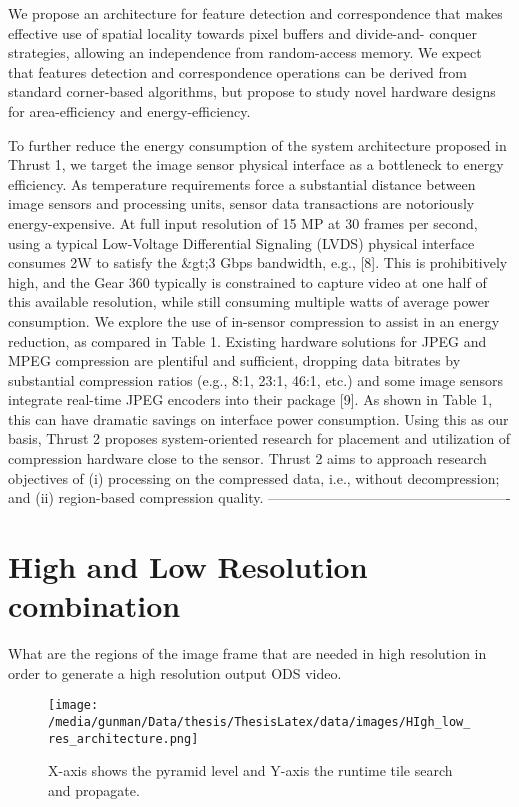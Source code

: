 We propose an architecture for feature detection and correspondence that makes effective use of spatial locality towards pixel buffers and divide-and- conquer strategies, allowing an independence from random-access memory. We expect that features detection and correspondence operations can be derived from standard corner-based algorithms, but propose to study novel hardware designs for area-efficiency and energy-efficiency. \newline

To further reduce the energy consumption of the system architecture proposed in Thrust 1, we target the image sensor physical interface as a bottleneck to energy efficiency. As temperature requirements force a substantial distance between image sensors and processing units, sensor data transactions are notoriously energy-expensive. At full input resolution of 15 MP at 30 frames per second, using a typical Low-Voltage Differential Signaling (LVDS) physical interface consumes 2W to satisfy the \&gt;3 Gbps bandwidth, e.g., [8]. This is prohibitively high, and the Gear 360 typically is constrained to capture video at one half of this available resolution, while still consuming multiple watts of average power consumption. We explore the use of in-sensor compression to assist in an energy reduction, as compared in Table 1. Existing hardware solutions for JPEG and MPEG compression are plentiful and sufficient, dropping data \newline
bitrates by substantial compression ratios (e.g., 8:1, 23:1, 46:1, etc.) and some image sensors integrate real-time JPEG encoders into their package [9]. As shown in Table 1, this can have dramatic savings on interface power consumption. Using this as our basis, Thrust 2 proposes system-oriented research for placement and utilization of compression hardware close to the sensor. Thrust 2 aims to approach research objectives of (i) processing on the compressed data, i.e., without decompression; and (ii) region-based compression quality.\newline
----------------------------------------------------


\section{High and Low Resolution combination}
What are the regions of the image frame that are needed in high resolution in order to generate a high resolution output ODS video. 
\begin{figure*}
	\begin{center}
		\texttt{[image: /media/gunman/Data/thesis/ThesisLatex/data/images/HIgh\_low\_res\_architecture.png]}
		\caption{X-axis shows the pyramid level and Y-axis the runtime tile search and propagate.}
		\label{fig:ex_4_9}
	\end{center}
	\vspace{-0.3in}
\end{figure*} 








